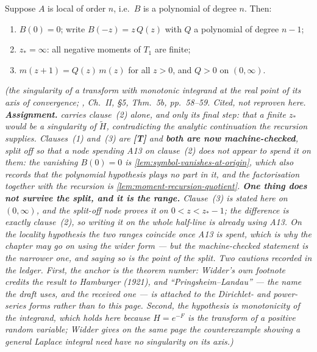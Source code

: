 \begin{lemma}\label{lem:moment-recursion}
Suppose $A$ is local of order $n$, i.e.\ $B$ is a polynomial of degree $n$. Then:
\begin{enumerate}
\item $B(0) = 0$; write $B(-z) = z\,Q(z)$ with $Q$ a polynomial of degree $n - 1$;
\item $z_* = \infty$: all negative moments of $T_1$ are finite;
\item $m(z+1) = Q(z)\,m(z)$ for all $z > 0$, and $Q > 0$ on $(0,\infty)$.
\end{enumerate}
\statusA\quad{}\quad\emph{(the singularity of a transform with monotonic integrand
at the real point of its axis of convergence; , Ch.~II, \S5,
Thm.~5b, pp.~58--59. Cited, not reproven here.
\textbf{Assignment.}  carries clause~(2) alone, and only its final step: that a
finite $z_*$ would be a singularity of $\tilde H$, contradicting the analytic continuation the
recursion supplies. Clauses~(1) and~(3) are \textbf{[T]} and \textbf{both are now
machine-checked}, split off so that a node spending A13 on clause~(2) does not appear to spend it
on them: the vanishing $B(0) = 0$ is \ref{lem:symbol-vanishes-at-origin}, which also records that
the polynomial hypothesis plays no part in it, and the factorisation together with the recursion
is \ref{lem:moment-recursion-quotient}. \textbf{One thing does not survive the split, and it is
the range.} Clause~(3) is stated here on $(0,\infty)$, and the split-off node proves it on
$0 < z < z_* - 1$; the difference is exactly clause~(2), so writing it on the whole half-line is
already using A13. On the locality hypothesis the two ranges coincide once A13 is spent, which is
why the chapter may go on using the wider form --- but the machine-checked statement is the
narrower one, and saying so is the point of the split.
Two cautions recorded in the ledger. First,
the anchor is the theorem number: Widder's own footnote credits the result to Hamburger
(1921), and ``Pringsheim--Landau'' --- the name the draft uses, and the received one --- is
attached to the Dirichlet- and power-series forms rather than to this page. Second, the
hypothesis is monotonicity of the integrand, which holds here because $H = e^{-F}$ is the
transform of a positive random variable; Widder gives on the same page the counterexample
showing a general Laplace integral need have no singularity on its axis.)}
\end{lemma}


